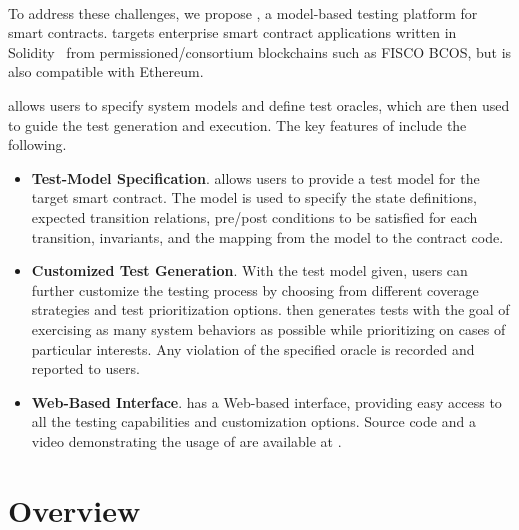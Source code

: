 \paragraph{\modcon}
To address these challenges, we propose \modcon, a model-based testing platform for smart contracts.
\modcon targets enterprise smart contract applications written in Solidity~\cite{solidity} from permissioned/consortium blockchains such as FISCO BCOS, but is also compatible with Ethereum.

\modcon allows users to specify system models and define test oracles, which are then used to guide
the test generation and execution.
The key features of \modcon include the following.
\begin{itemize}[leftmargin=*,topsep=2pt]
	\item \textbf{Test-Model Specification}.
	\modcon allows users to provide a test model for the target smart contract.
	The model is used to specify the state definitions, expected transition relations,
	pre/post conditions to be satisfied for each transition, invariants, and the mapping from the
	model to the contract code.
	\item \textbf{Customized Test Generation}.
	With the test model given, users can further customize the testing process by choosing from
	different coverage strategies and test prioritization options.
	\modcon then generates tests with the goal of exercising as many system behaviors as possible while
	prioritizing on cases of particular interests.
	Any violation of the specified oracle is recorded and reported to users.
	\item \textbf{Web-Based Interface}.
	\modcon has a Web-based interface, providing easy access to all the testing capabilities and
	customization options.
	Source code and a video demonstrating the usage of \modcon are available at \modconurl.
\end{itemize}


\section{\modcon Overview}
\label{sec:Overview}

